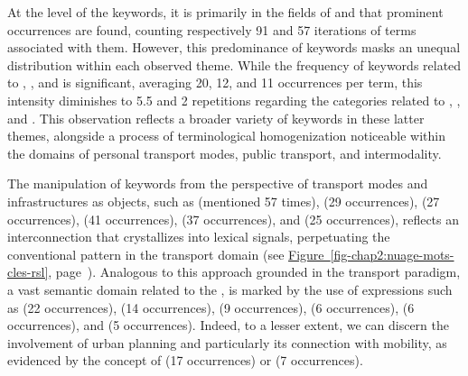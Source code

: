\begin{refsegment}
At the level of the keywords, it is primarily in the fields of  and  that prominent occurrences are found, counting respectively 91 and 57 iterations of terms associated with them. However, this predominance of keywords masks an unequal distribution within each observed theme. While the frequency of keywords related to , , and  is significant, averaging 20, 12, and 11 occurrences per term, this intensity diminishes to 5.5 and 2 repetitions regarding the categories related to , , and . This observation reflects a broader variety of keywords in these latter themes, alongside a process of terminological homogenization noticeable within the domains of personal transport modes, public transport, and intermodality.%

The manipulation of keywords from the perspective of transport modes and infrastructures as objects, such as  (mentioned 57 times),  (29 occurrences),  (27 occurrences),  (41 occurrences),  (37 occurrences), and  (25 occurrences), reflects an interconnection that crystallizes into lexical signals, perpetuating the conventional pattern in the transport domain (see \hyperref[fig-chap2:nuage-mots-cles-rsl]{Figure~\ref{fig-chap2:nuage-mots-cles-rsl}}, page~\pageref{fig-chap2:nuage-mots-cles-rsl}). Analogous to this approach grounded in the transport paradigm, a vast semantic domain related to the  \textcolor{blue}{\autocites{sheller_new_2006}[8]{sheller_mobilizing_2016}[13]{randell_no_2020}}, is marked by the use of expressions such as  (22 occurrences),  (14 occurrences),  (9 occurrences),  (6 occurrences),  (6 occurrences), and  (5 occurrences). Indeed, to a lesser extent, we can discern the involvement of urban planning and particularly its connection with mobility, as evidenced by the concept of  (17 occurrences) or  (7 occurrences).%


\end{refsegment}
